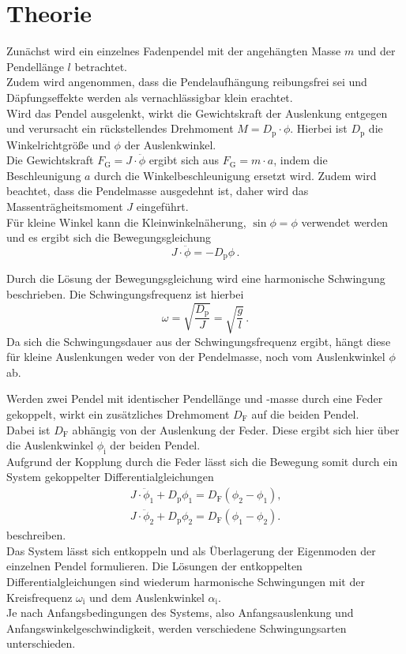 \section{Theorie}
\label{sec:Theorie}
Zunächst wird ein einzelnes Fadenpendel mit der angehängten Masse $m$ und der Pendellänge $l$ betrachtet. \\
Zudem wird angenommen, dass die Pendelaufhängung reibungsfrei sei und Däpfungseffekte werden als vernachlässigbar klein erachtet.\\
Wird das Pendel ausgelenkt, wirkt die Gewichtskraft der Auslenkung entgegen und verursacht ein rückstellendes Drehmoment $M=D_{\mathrm{p}}\cdot \phi$.
Hierbei ist $D_{\mathrm{p}}$ die Winkelrichtgröße und $\phi$ der Auslenkwinkel.\\
Die Gewichtskraft $F_{\mathrm{G}}=J\cdot\ddot\phi$ ergibt sich aus $F_{\mathrm{G}}=m\cdot a$, indem die Beschleunigung $a$ durch die Winkelbeschleunigung ersetzt wird.
Zudem wird beachtet, dass die Pendelmasse ausgedehnt ist, daher wird das Massenträgheitsmoment $J$ eingeführt. \\
Für kleine Winkel kann die Kleinwinkelnäherung, $\sin{\phi}=\phi$ verwendet werden und es ergibt sich die Bewegungsgleichung
\begin{equation}
	J\cdot \ddot\phi=-D_{\mathrm{p}}\phi \, \text{.}
\end{equation}

Durch die Lösung der Bewegungsgleichung wird eine harmonische Schwingung beschrieben. Die Schwingungsfrequenz ist hierbei
\begin{equation}
	\omega=\sqrt{\frac{D_{\mathrm{p}}}{J}}=\sqrt{\frac{g}{l}} \, \text{.}
\end{equation}
Da sich die Schwingungsdauer aus der Schwingungsfrequenz ergibt, hängt diese für kleine Auslenkungen weder von der Pendelmasse, noch vom Auslenkwinkel $\phi$ ab.

Werden zwei Pendel mit identischer Pendellänge und -masse durch eine Feder gekoppelt, wirkt ein zusätzliches Drehmoment $D_{\mathrm{F}}$ auf die beiden Pendel.\\
Dabei ist $D_{\mathrm{F}}$ abhängig von der Auslenkung der Feder. Diese ergibt sich hier über die Auslenkwinkel $\phi_{\mathrm{i}}$ der beiden Pendel.\\
Aufgrund der Kopplung durch die Feder lässt sich die Bewegung somit durch ein System gekoppelter Differentialgleichungen
\begin{gather}
	J\cdot \ddot \phi_1 + D_{\mathrm{p}} \phi_1=D_{\mathrm{F}}(\phi_2-\phi_1)\text{,}\\
	J\cdot \ddot \phi_2 + D_{\mathrm{p}} \phi_2=D_{\mathrm{F}}(\phi_1-\phi_2)\text{.}
\end{gather}
beschreiben.\\
Das System lässt sich entkoppeln und als Überlagerung der Eigenmoden der einzelnen Pendel formulieren.
Die Lösungen der entkoppelten Differentialgleichungen sind wiederum harmonische Schwingungen mit der Kreisfrequenz $\omega_{\mathrm{i}}$ und dem Auslenkwinkel $\alpha_{\mathrm{i}}$.\\
Je nach Anfangsbedingungen des Systems, also Anfangsauslenkung und Anfangswinkelgeschwindigkeit, werden verschiedene Schwingungsarten unterschieden.
